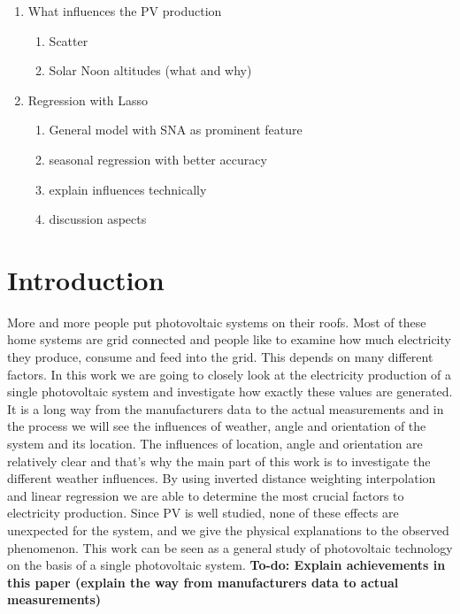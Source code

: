 \documentclass{article}
\begin{document}
\begin{enumerate}
	\item What influences the PV production\begin{enumerate}
		\item Scatter
		\item Solar Noon altitudes (what and why)
	\end{enumerate}
	\item Regression with Lasso\begin{enumerate}
		\item General model with SNA as prominent feature
		\item seasonal regression with better accuracy
		\item explain influences technically
		\item discussion aspects
	\end{enumerate}
\end{enumerate}


\section{Introduction}\label{sec:intro}
More and more people put photovoltaic systems on their roofs. 
Most of these home systems are grid connected and people like to examine how much electricity they produce, consume and feed into the grid. This depends on many different factors.
In this work we are going to closely look at the electricity production of a single photovoltaic system and investigate how exactly these values are generated.
It is a long way from the manufacturers data to the actual measurements and in the process we will see the influences of weather, angle and orientation of the system and its location.
The influences of location, angle and orientation are relatively clear and that's why the main part of this work is to investigate the different weather influences.
By using inverted distance weighting interpolation and linear regression we are able to determine the most crucial factors to electricity production.
Since PV is well studied, none of these effects are unexpected for the system, and we give the physical explanations to the observed phenomenon.
This work can be seen as a general study of photovoltaic technology on the basis of a single photovoltaic system. 
\textbf{To-do: Explain achievements in this paper (explain the way from manufacturers data to actual measurements)}
\end{document}
